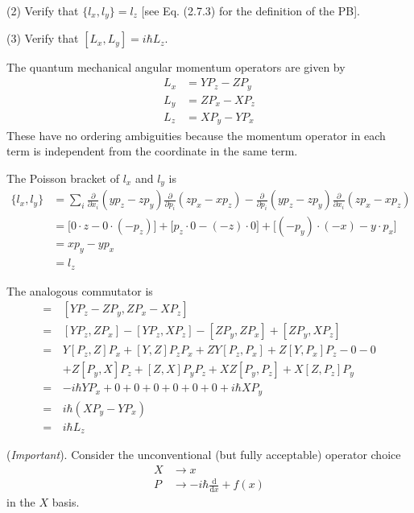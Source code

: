 \documentclass[../principles-of-quantum-mechanics.tex]{subfiles}
\begin{document}
\begin{questions}
		(2) Verify that $\{l_x, l_y\} = l_z$ [see Eq. (2.7.3) for the definition of the PB].
		
		(3) Verify that $[L_x, L_y] = i\hbar L_z$.
		\begin{solution}
			The quantum mechanical angular momentum operators are given by
			\begin{align*}
				L_x &= YP_z - ZP_y \\
				L_y &= ZP_x - XP_z \\
				L_z &= XP_y - YP_x
			\end{align*}
			These have no ordering ambiguities because the momentum operator in each term is independent from the coordinate in the same term.
			
			The Poisson bracket of $l_x$ and $l_y$ is
			\begin{align*}
				\{l_x, l_y\} &= \sum_i\frac{\partial}{\partial x_i}(yp_z - zp_y)\frac{\partial}{\partial p_i}(zp_x - xp_z) - \frac{\partial}{\partial p_i}(yp_z - zp_y)\frac{\partial}{\partial x_i}(zp_x - xp_z) \\
				&= \big[0\cdot z - 0\cdot(-p_z)\big] + \big[p_z\cdot 0 - (-z)\cdot 0\big] + \big[(-p_y)\cdot(-x) - y\cdot p_x\big] \\
				&= xp_y - yp_x \\
				&= l_z
			\end{align*}
		
			The analogous commutator is 
			\begin{align*}
				[L_x, L_y] =\,&[YP_z - ZP_y, ZP_x - XP_z] \\
				=\,&[YP_z, ZP_x] - [YP_z, XP_z] - [ZP_y, ZP_x] + [ZP_y, XP_z] \\
				=\,&Y[P_z, Z]P_x + [Y, Z]P_zP_x + ZY[P_z, P_x] + Z[Y, P_x]P_z - 0 - 0 \\
				&+ Z[P_y, X]P_z + [Z, X]P_yP_z + XZ[P_y, P_z] + X[Z, P_z]P_y \\
				=\,&{-i\hbar} YP_x + 0 + 0 + 0 + 0 + 0 + 0 + i\hbar XP_y \\
				=\,&i\hbar(XP_y - YP_x) \\
				=\,&i\hbar L_z
			\end{align*}
		\end{solution}
		
		\question (\textit{Important}). Consider the unconventional (but fully acceptable) operator choice
		\begin{align*}
			X &\to x \\
			P &\to {-i\hbar}\frac{\mathrm{d}}{\mathrm{d}x} + f(x)
		\end{align*}
		in the $X$ basis.
		

\end{questions}
\end{document}
